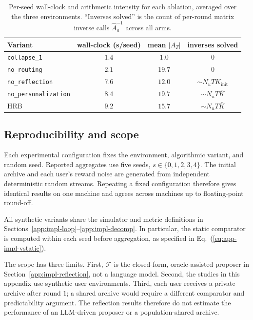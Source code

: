 \documentclass{article} %
\renewcommand{\eqref}[1]{\textup{(\ref{#1})}}
\begin{document}
\begin{table}[h]
\centering
\small
\begin{tabular}{lccc}
\toprule
Variant & wall-clock (s/seed) & mean $|A_T|$ & inverses solved \\
\midrule
\texttt{collapse\_1}        & $1.4$ & $1.0$  & $0$ \\
\texttt{no\_routing}        & $2.1$ & $19.7$ & $0$ \\
\texttt{no\_reflection}     & $7.6$ & $12.0$ & $\sim N_u T K_{\text{init}}$ \\
\texttt{no\_personalization}& $8.4$ & $19.7$ & $\sim N_u T \bar K$ \\
\textnormal{HRB}               & $9.2$ & $15.7$ & $\sim N_u T \bar K$ \\
\bottomrule
\end{tabular}
\caption{Per-seed wall-clock and arithmetic intensity for each ablation, averaged over the three environments. ``Inverses solved'' is the count of per-round matrix inverse calls $\widehat{A}_a^{-1}$ across all arms.}
\label{tab:app-impl-runtime}
\end{table}

\subsection{Reproducibility and scope}

\label{app:impl-repro}
\label{app:impl-not-included}

Each experimental configuration fixes the environment, algorithmic variant,
and random seed. Reported aggregates use five seeds, \(s\in\{0,1,2,3,4\}\).
The initial archive and each user's reward noise are generated from independent
deterministic random streams. Repeating a fixed configuration therefore gives
identical results on one machine and agrees across machines up to floating-point
round-off.

All synthetic variants share the simulator and metric definitions in
Sections~\ref{app:impl-loop}--\ref{app:impl-decomp}. In particular, the static
comparator is computed within each seed before aggregation, as specified in
Eq.~\eqref{eq:app-impl-vstatic}.

The scope has three limits. First, \(\mathcal F\) is the closed-form,
oracle-assisted proposer in Section~\ref{app:impl-reflection}, not a language
model. Second, the studies in this appendix use synthetic user environments.
Third, each user receives a private archive after round \(1\); a shared archive
would require a different comparator and predictability argument. The
reflection results therefore do not estimate the performance of an LLM-driven
proposer or a population-shared archive.
\end{document}
